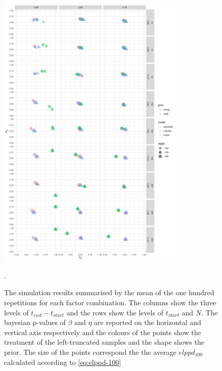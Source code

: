\begin{figure}
    \centering
    \includegraphics[width=0.8\textwidth]{./figures/ch-2/sim-results-pvalues.pdf}
    \caption{The simulation results summarised by the mean of the one hundred repetitions for each factor combination. The columns show the three levels of $t_{end} - t_{start}$ and the rows show the levels of $t_{start}$ and $N$. The bayesian p-values of $\beta$ and $\eta$ are reported on the horizontal and vertical axis respectively and the colours of the points show the treatment of the left-truncated samples and the shape shows the prior. The size of the points correspond the the average $elppd_{100}$ calculated according to \eqref{eq:elppd-100}}.
    \label{fig:sim-study-pvalue}
\end{figure}

